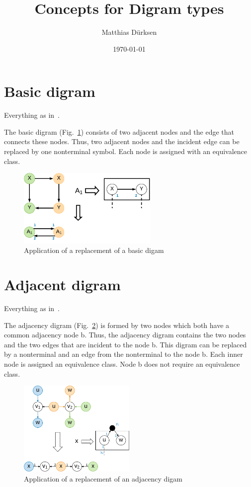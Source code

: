 \documentclass[a4paper]{scrartcl}
\title{Concepts for Digram types}
\author{Matthias Dürksen}
\date{\today}
\begin{document}
\maketitle

\section{Basic digram}\label{sec:motivation}

Everything as in~\cite{mattdk}.

The basic digram (Fig.~\ref{fig:basicDigram}) consists of two adjacent nodes and the edge that connects these nodes. Thus, two adjacent nodes and the incident edge can be replaced by one nonterminal symbol. Each node is assigned with an equivalence class.

\begin{figure}[h]
	\centering
	\includegraphics[width=0.6\textwidth]{img/basicDigram}
	\caption{Application of a replacement of a basic digam}
	\label{fig:basicDigram}
\end{figure}

\section{Adjacent digram}

Everything as in~\cite{mattdk}.

The adjacency digram (Fig.~\ref{fig:adjazenzDigram}) is formed by two nodes which both have a common adjacency node b. Thus, the adjacency digram contains the two nodes and the two edges that are incident to the node b. This digram can be replaced by a nonterminal and an edge from the nonterminal to the node b. Each inner node is assigned an equivalence class. Node b does not require an equivalence class.

\begin{figure}[h]
	\centering
	\includegraphics[width=0.5\textwidth]{img/adjazenzDigram}
	\caption{Application of a replacement of an adjacency digam}
	\label{fig:adjazenzDigram}
\end{figure}
\end{document}
